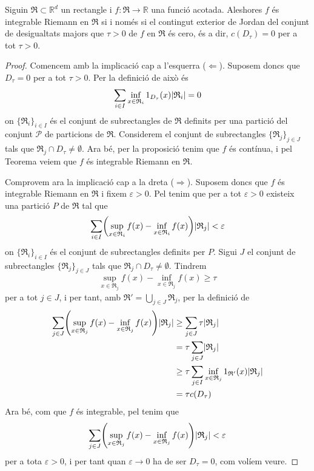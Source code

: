 \documentclass[../Apunts.tex]{subfiles}
\begin{document}
	\begin{theorem}
		Siguin \(\mathfrak{R}\subset\mathbb{R}^{d}\) un rectangle i \(f\colon\mathfrak{R}\to\mathbb{R}\) una funció acotada. Aleshores \(f\) és integrable Riemann en \(\mathfrak{R}\) si i només si el contingut exterior de Jordan del conjunt de desigualtats majors que \(\tau>0\) de \(f\) en \(\mathfrak{R}\) és cero, és a dir, \(c(D_{\tau})=0\) per a tot \(\tau>0\).
		\begin{proof}
			Comencem amb la implicació cap a l'esquerra (\(\Leftarrow\)). Suposem doncs que \(D_{\tau}=0\) per a tot \(\tau>0\). Per la definició de  això és
			\[\sum_{i\in I}\inf_{x\in \mathfrak{R}_{i}}1_{D_{\tau}}(x)\abs{\mathfrak{R}_{i}}=0\]
			on \(\{\mathfrak{R}_{i}\}_{i\in I}\) és el conjunt de subrectangles de \(\mathfrak{R}\) definits per una partició del conjunt \(\mathcal{P}\) de particions de \(\mathfrak{R}\). Considerem el conjunt de subrectangles \(\{\mathfrak{R}_{j}\}_{j\in J}\) tals que \(\mathfrak{R}_{j}\cap D_{\tau}\neq\emptyset\). Ara bé, per la proposició  tenim que \(f\) és contínua, i pel Teorema  veiem que \(f\) és integrable Riemann en \(\mathfrak{R}\).
			
			Comprovem ara la implicació cap a la dreta (\(\Rightarrow\)). Suposem doncs que \(f\) és integrable Riemann en \(\mathfrak{R}\) i fixem \(\varepsilon>0\). Pel  tenim que per a tot \(\varepsilon>0\) existeix una partició \(P\) de \(\mathfrak{R}\) tal que
			\[\sum_{i\in I}\left(\sup_{x\in \mathfrak{R}_{i}}f(x)-\inf_{x\in \mathfrak{R}_{i}}f(x)\right)\abs{\mathfrak{R}_{j}}<\varepsilon\]
			on \(\{\mathfrak{R}_{i}\}_{i\in I}\) és el conjunt de subrectangles definits per \(P\). Sigui \(J\) el conjunt de subrectangles \(\{\mathfrak{R}_{j}\}_{j\in J}\) tals que \(\mathfrak{R}_{j}\cap D_{\tau}\neq\emptyset\). Tindrem
			\[\sup_{x\in \mathfrak{R}_{j}}f(x)-\inf_{x\in \mathfrak{R}_{j}}f(x)\geq\tau\]
			per a tot \(j\in J\), i per tant, amb \(\mathfrak{R}'=\bigcup_{j\in J}\mathfrak{R}_{j}\), per la definició de 
			\begin{align*}
			\sum_{j\in J}\left(\sup_{x\in \mathfrak{R}_{j}}f(x)-\inf_{x\in \mathfrak{R}_{j}}f(x)\right)\abs{\mathfrak{R}_{j}}&\geq\sum_{j\in J}\tau\abs{\mathfrak{R}_{j}}\\
			&=\tau\sum_{j\in J}\abs{\mathfrak{R}_{j}}\\
			&\geq\tau\sum_{j\in I}\inf_{x\in \mathfrak{R}_{j}}1_{\mathfrak{R}'}(x)\abs{\mathfrak{R}_{j}}\\
			&=\tau c(D_{\tau})
			\end{align*}
			Ara bé, com que \(f\) és integrable, pel  tenim que
			\[\sum_{j\in J}\left(\sup_{x\in \mathfrak{R}_{j}}f(x)-\inf_{x\in \mathfrak{R}_{j}}f(x)\right)\abs{\mathfrak{R}_{j}}<\varepsilon\]
			per a tota \(\varepsilon>0\), i per tant quan \(\varepsilon\to0\) ha de ser \(D_{\tau}=0\), com volíem veure.
		\end{proof}
	\end{theorem}
\end{document}
